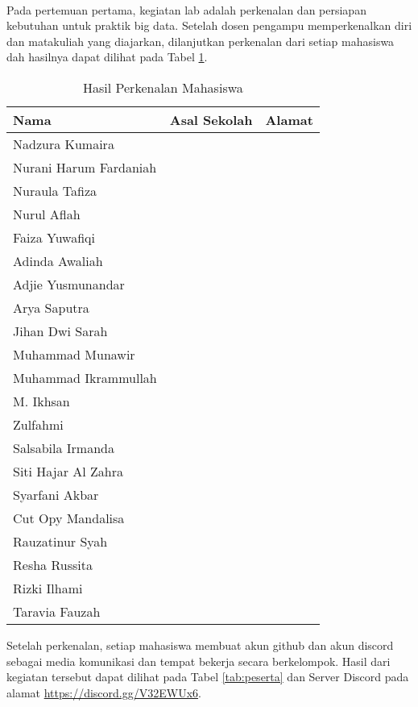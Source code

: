 \documentclass[a4paper]{tufte-handout}
\begin{document}
\clearpage
{}

 \\
Pada pertemuan pertama, kegiatan lab adalah perkenalan dan persiapan kebutuhan untuk praktik big data. Setelah dosen pengampu memperkenalkan diri dan matakuliah yang diajarkan, dilanjutkan perkenalan dari setiap mahasiswa dah hasilnya dapat dilihat pada Tabel \ref{tab:perkenalan}.

\begin{table}[!ht]
\caption{Hasil Perkenalan Mahasiswa}
\label{tab:perkenalan}
\centering
\begin{tabular}{llr} 
\toprule
Nama 	&	Asal Sekolah 	&	Alamat\\
\midrule
Nadzura Kumaira			& & \\
Nurani Harum Fardaniah	& & \\
Nuraula Tafiza			& & \\
Nurul Aflah				& & \\
Faiza Yuwafiqi			& & \\
Adinda Awaliah			& & \\
Adjie Yusmunandar		& & \\
Arya Saputra			& & \\
Jihan Dwi Sarah			& & \\
Muhammad Munawir		& & \\
Muhammad Ikrammullah	& & \\
M. Ikhsan				& & \\
Zulfahmi				& & \\
Salsabila Irmanda		& & \\
Siti Hajar Al Zahra		& & \\
Syarfani Akbar			& & \\
Cut Opy Mandalisa		& & \\
Rauzatinur Syah			& & \\
Resha Russita			& & \\
Rizki Ilhami			& & \\
Taravia Fauzah			& & \\
\end{tabular}
\end{table}

Setelah perkenalan, setiap mahasiswa membuat akun github dan akun discord sebagai media komunikasi dan tempat bekerja secara berkelompok. Hasil dari kegiatan tersebut dapat dilihat pada Tabel \ref{tab:peserta} dan Server Discord pada alamat \url{https://discord.gg/V32EWUx6}.
\end{document}
